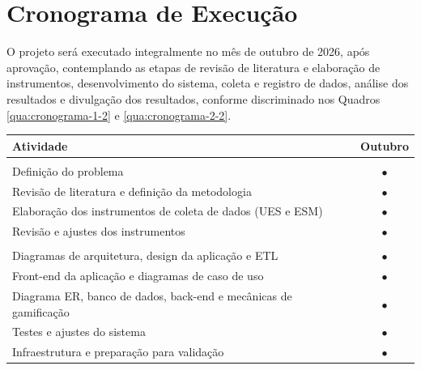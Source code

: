 \chapter{Cronograma de Execução}

O projeto será executado integralmente no mês de outubro de 2026, após aprovação, contemplando as etapas de revisão de literatura e elaboração de instrumentos, desenvolvimento do sistema, coleta e registro de dados, análise dos resultados e divulgação dos resultados, conforme discriminado nos Quadros \ref{qua:cronograma-1-2} e \ref{qua:cronograma-2-2}.

\begin{quadro}[htbp]
    \centering
    \caption{\label{qua:cronograma-1-2}Cronograma de Execução (Outubro/2026)}
    \renewcommand{\arraystretch}{1.2}
    \begin{tabular}{|>{\raggedright\arraybackslash}p{11cm}|c|}
    \hline
    \textbf{Atividade} & \textbf{Outubro} \\ \hline
    \multicolumn{2}{|c|}{\textbf{Revisão de literatura, metodologia e elaboração de instrumentos}} \\ \hline
    Definição do problema & $\bullet$ \\ \hline
    Revisão de literatura e definição da metodologia & $\bullet$ \\ \hline
    Elaboração dos instrumentos de coleta de dados (UES e ESM) & $\bullet$ \\ \hline
    Revisão e ajustes dos instrumentos & $\bullet$ \\ \hline
    \multicolumn{2}{|c|}{\textbf{Desenvolvimento do sistema}} \\ \hline
    Diagramas de arquitetura, design da aplicação e ETL & $\bullet$ \\ \hline
    Front-end da aplicação e diagramas de caso de uso & $\bullet$ \\ \hline
    Diagrama ER, banco de dados, back-end e mecânicas de gamificação & $\bullet$ \\ \hline
    Testes e ajustes do sistema & $\bullet$ \\ \hline
    Infraestrutura e preparação para validação & $\bullet$ \\ \hline
    \end{tabular}
\end{quadro}

